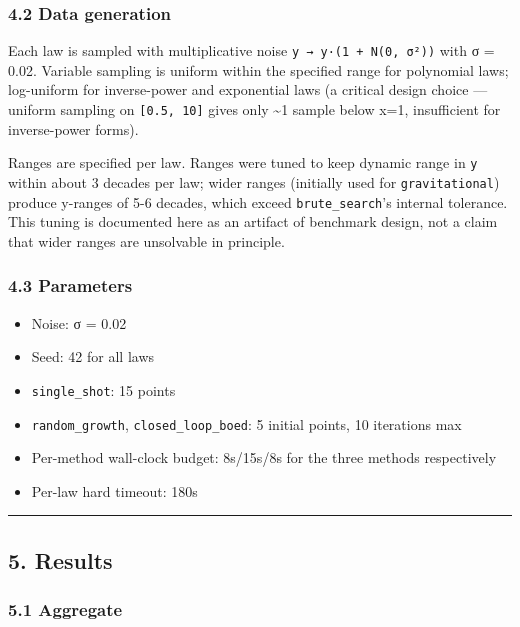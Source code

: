 \documentclass[
]{article}
\providecommand{\tightlist}{%
  \setlength{\itemsep}{0pt}\setlength{\parskip}{0pt}}
\begin{document}
\subsubsection{4.2 Data generation}\label{data-generation}

Each law is sampled with multiplicative noise
\texttt{y\ →\ y·(1\ +\ N(0,\ σ²))} with σ = 0.02. Variable sampling is
uniform within the specified range for polynomial laws; log-uniform for
inverse-power and exponential laws (a critical design choice --- uniform
sampling on \texttt{{[}0.5,\ 10{]}} gives only \textasciitilde1 sample
below x=1, insufficient for inverse-power forms).

Ranges are specified per law. Ranges were tuned to keep dynamic range in
\texttt{y} within about 3 decades per law; wider ranges (initially used
for \texttt{gravitational}) produce y-ranges of 5-6 decades, which
exceed \texttt{brute\_search}'s internal tolerance. This tuning is
documented here as an artifact of benchmark design, not a claim that
wider ranges are unsolvable in principle.

\subsubsection{4.3 Parameters}\label{parameters}

\begin{itemize}
\tightlist
\item
  Noise: σ = 0.02
\item
  Seed: 42 for all laws
\item
  \texttt{single\_shot}: 15 points
\item
  \texttt{random\_growth}, \texttt{closed\_loop\_boed}: 5 initial
  points, 10 iterations max
\item
  Per-method wall-clock budget: 8s/15s/8s for the three methods
  respectively
\item
  Per-law hard timeout: 180s
\end{itemize}

\begin{center}\rule{0.5\linewidth}{0.5pt}\end{center}

\subsection{5. Results}\label{results}

\subsubsection{5.1 Aggregate}\label{aggregate}
\end{document}
